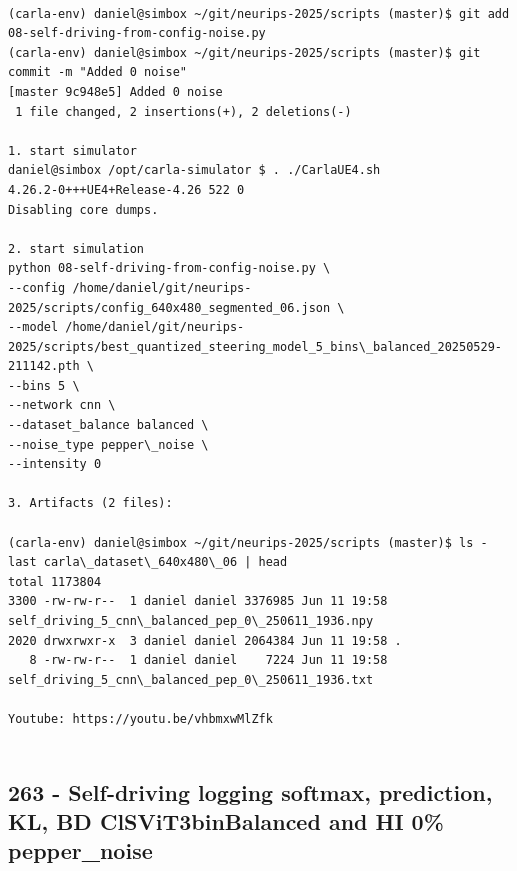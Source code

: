 \begin{verbatim}

(carla-env) daniel@simbox ~/git/neurips-2025/scripts (master)$ git add 08-self-driving-from-config-noise.py
(carla-env) daniel@simbox ~/git/neurips-2025/scripts (master)$ git commit -m "Added 0 noise"
[master 9c948e5] Added 0 noise
 1 file changed, 2 insertions(+), 2 deletions(-)
 
1. start simulator
daniel@simbox /opt/carla-simulator $ . ./CarlaUE4.sh 
4.26.2-0+++UE4+Release-4.26 522 0
Disabling core dumps.

2. start simulation
python 08-self-driving-from-config-noise.py \
--config /home/daniel/git/neurips-2025/scripts/config_640x480_segmented_06.json \
--model /home/daniel/git/neurips-2025/scripts/best_quantized_steering_model_5_bins\_balanced_20250529-211142.pth \
--bins 5 \
--network cnn \
--dataset_balance balanced \
--noise_type pepper\_noise \
--intensity 0

3. Artifacts (2 files):

(carla-env) daniel@simbox ~/git/neurips-2025/scripts (master)$ ls -last carla\_dataset\_640x480\_06 | head
total 1173804
3300 -rw-rw-r--  1 daniel daniel 3376985 Jun 11 19:58 self_driving_5_cnn\_balanced_pep_0\_250611_1936.npy
2020 drwxrwxr-x  3 daniel daniel 2064384 Jun 11 19:58 .
   8 -rw-rw-r--  1 daniel daniel    7224 Jun 11 19:58 self_driving_5_cnn\_balanced_pep_0\_250611_1936.txt

Youtube: https://youtu.be/vhbmxwMlZfk


\end{verbatim}

\subsection{263 - Self-driving logging softmax, prediction, KL, BD ClSViT3binBalanced and HI 0\% pepper\_noise}
\label{app_res:263}

